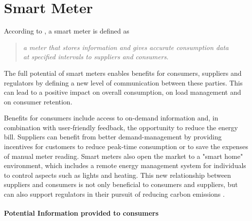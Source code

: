 \section{Smart Meter}
\label{ch:Content1:sec:Smart Meter}
According to \cite{Darby2008}, a smart meter is defined as
\begin{quotation}
\textit{a meter that stores information and gives accurate consumption data\\ 
at specified intervals to suppliers and consumers.}
\end{quotation}

The full potential of smart meters enables benefits for consumers, suppliers and regulators by defining a new level of communication between these parties.  This can lead to a positive impact on overall consumption, on load management and on consumer retention.

Benefits for consumers include access to on-demand information and, in combination with user-friendly feedback, the opportunity to reduce the energy bill.
Suppliers can benefit from better demand-management by providing incentives for customers to reduce peak-time consumption or to save the expenses of manual meter reading. Smart meters also open the market to a "smart home" environment, which includes a remote energy management system for individuals to control aspects such as lights and heating.
This new relationship between suppliers and consumers is not only beneficial to consumers and suppliers, but can also support regulators in their pursuit of reducing carbon emissions  \citep{Darby2008}.

\paragraph{Potential Information provided to consumers}


